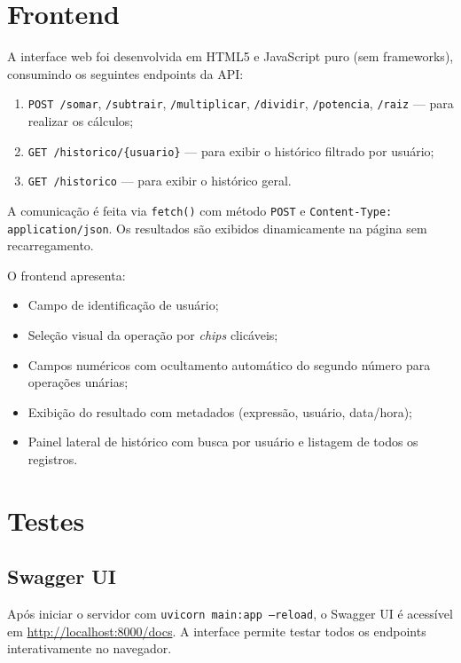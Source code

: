 \documentclass[12pt, a4paper]{article}
\begin{document}
\section{Frontend}

A interface web foi desenvolvida em HTML5 e JavaScript puro (sem frameworks), consumindo os seguintes endpoints da API:

\begin{enumerate}[leftmargin=*]
  \item \texttt{POST /somar}, \texttt{/subtrair}, \texttt{/multiplicar}, \texttt{/dividir}, \texttt{/potencia}, \texttt{/raiz} — para realizar os cálculos;
  \item \texttt{GET /historico/\{usuario\}} — para exibir o histórico filtrado por usuário;
  \item \texttt{GET /historico} — para exibir o histórico geral.
\end{enumerate}

A comunicação é feita via \texttt{fetch()} com método \texttt{POST} e \texttt{Content-Type: application/json}. Os resultados são exibidos dinamicamente na página sem recarregamento.

O frontend apresenta:
\begin{itemize}[leftmargin=*]
  \item Campo de identificação de usuário;
  \item Seleção visual da operação por \textit{chips} clicáveis;
  \item Campos numéricos com ocultamento automático do segundo número para operações unárias;
  \item Exibição do resultado com metadados (expressão, usuário, data/hora);
  \item Painel lateral de histórico com busca por usuário e listagem de todos os registros.
\end{itemize}

\section{Testes}

\subsection{Swagger UI}

Após iniciar o servidor com \texttt{uvicorn main:app --reload}, o Swagger UI é acessível em \url{http://localhost:8000/docs}. A interface permite testar todos os endpoints interativamente no navegador.
\end{document}
